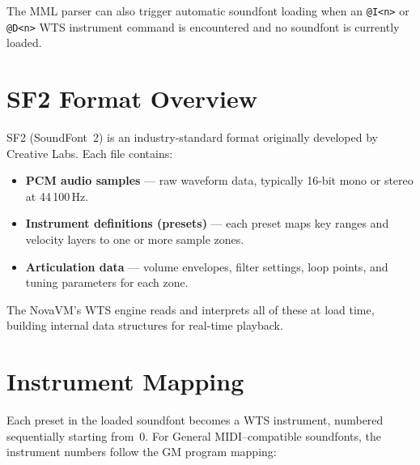 \begin{notebox}
The MML parser can also trigger automatic soundfont loading when an
\texttt{@I\textless n\textgreater} or \texttt{@D\textless n\textgreater} WTS
instrument command is encountered and no soundfont is currently loaded.
\end{notebox}


\section{SF2 Format Overview}
\label{sec:sf2-format}

SF2 (SoundFont~2) is an industry-standard format originally developed by
Creative Labs.  Each file contains:

\begin{itemize}
  \item \textbf{PCM audio samples} --- raw waveform data, typically 16-bit mono
        or stereo at 44\,100\,Hz.
  \item \textbf{Instrument definitions (presets)} --- each preset maps key ranges
        and velocity layers to one or more sample zones.
  \item \textbf{Articulation data} --- volume envelopes, filter settings, loop
        points, and tuning parameters for each zone.
\end{itemize}

The NovaVM's WTS engine reads and interprets all of these at load time, building
internal data structures for real-time playback.


\section{Instrument Mapping}
\label{sec:wts-instruments}

Each preset in the loaded soundfont becomes a WTS instrument, numbered
sequentially starting from~0.  For General MIDI--compatible soundfonts, the
instrument numbers follow the GM program mapping:


